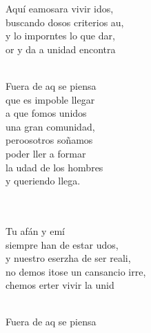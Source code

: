 \documentclass[12pt]{article}
\begin{document}
\begin{multicols*}{2}
        \begin{cancion}%
            Aquí eamosara vivir idos,\\
            buscando dosos criterios au,\\
            y lo imporntes lo que dar,\\
            or y da a unidad encontra  \\\jump\\
            \begin{chorus}%
            Fuera de aq se piensa  \\
            que es impoble llegar\\
            a que fomos unidos \\
        una gran comunidad,\\
            peroosotros soñamos \\
            poder ller a formar\\
            la udad de los hombres \\
            y queriendo llega.\\
            \end{chorus}%
            \jump\\
        \jump
                  \\
            Tu afán y emí \\
            siempre han de estar udos, \\
            y nuestro eserzha de ser reali,\\
            no demos itose un cansancio irre,\\
            chemos erter vivir la unid\\\jump\\
            \begin{chorus}%
            Fuera de aq se piensa  \\

\end{chorus}
\end{cancion}
\end{multicols*}
\end{document}
